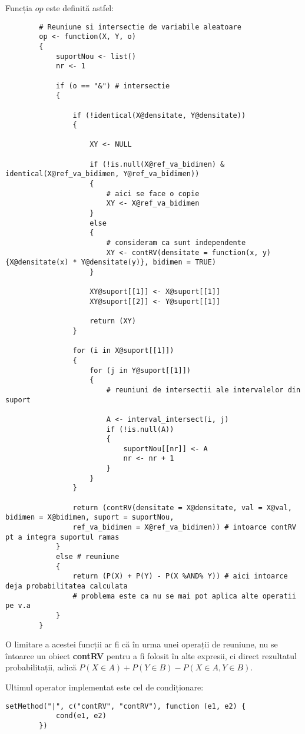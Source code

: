 \documentclass[12pt]{article}
\begin{document}
	Funcția $op$ este definită astfel:
	\begin{lstlisting}
		# Reuniune si intersectie de variabile aleatoare
		op <- function(X, Y, o)
		{	
			suportNou <- list()
			nr <- 1
			
			if (o == "&") # intersectie
			{
				
				if (!identical(X@densitate, Y@densitate))
				{
					
					XY <- NULL
					
					if (!is.null(X@ref_va_bidimen) & identical(X@ref_va_bidimen, Y@ref_va_bidimen))
					{
						# aici se face o copie
						XY <- X@ref_va_bidimen
					}
					else
					{
						# consideram ca sunt independente
						XY <- contRV(densitate = function(x, y) {X@densitate(x) * Y@densitate(y)}, bidimen = TRUE)
					}
					
					XY@suport[[1]] <- X@suport[[1]]
					XY@suport[[2]] <- Y@suport[[1]]
					
					return (XY)
				}
				
				for (i in X@suport[[1]])
				{
					for (j in Y@suport[[1]])
					{
						# reuniuni de intersectii ale intervalelor din suport
						
						A <- interval_intersect(i, j)
						if (!is.null(A))
						{
							suportNou[[nr]] <- A
							nr <- nr + 1
						}
					}
				}
				
				return (contRV(densitate = X@densitate, val = X@val, bidimen = X@bidimen, suport = suportNou,
				ref_va_bidimen = X@ref_va_bidimen)) # intoarce contRV pt a integra suportul ramas
			}
			else # reuniune
			{
				return (P(X) + P(Y) - P(X %AND% Y)) # aici intoarce deja probabilitatea calculata
				# problema este ca nu se mai pot aplica alte operatii pe v.a
			}
		}
	\end{lstlisting}\par
	O limitare a acestei funcții ar fi că în urma unei operații de reuniune, nu se întoarce un obiect \textbf{contRV} pentru a fi folosit în alte expresii, ci direct rezultatul probabilitații, adică $P(X \in A) + P(Y \in B) - P(X \in A, Y \in B)$.\vspace*{2\baselineskip}\par
	
	Ultimul operator implementat este cel de condiționare:
	\begin{lstlisting}[numbers=none]
		setMethod("|", c("contRV", "contRV"), function (e1, e2) {
			cond(e1, e2)
		})
	\end{lstlisting}
	
\end{document}
